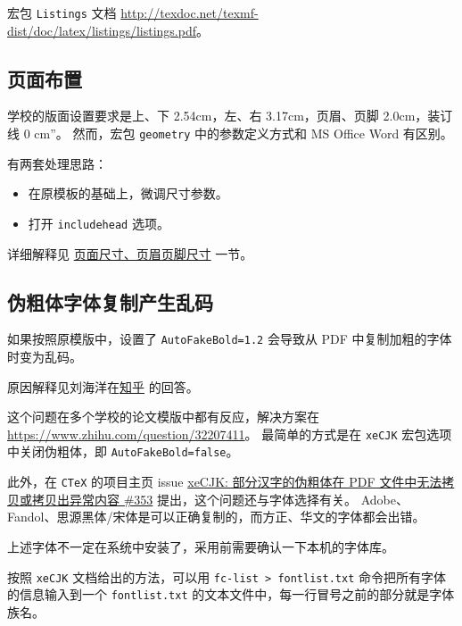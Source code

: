 \documentclass[../Main/thesis.tex]{subfiles}
\begin{document}
宏包 \texttt{Listings} 文档
\url{http://texdoc.net/texmf-dist/doc/latex/listings/listings.pdf}。

\subsection{页面布置}

学校的版面设置要求是上、下 2.54cm，左、右 3.17cm，页眉、页脚
2.0cm，装订线 0 cm''。 然而，宏包 \texttt{geometry}
中的参数定义方式和 MS Office Word 有区别。

有两套处理思路：

\begin{itemize}
\item
  在原模板的基础上，微调尺寸参数。

\item
  打开 \texttt{includehead} 选项。

\end{itemize}

详细解释见
\protect\hyperlink{geometry-ux5cux25e9ux5cux25a1ux5cux25b5ux5cux25e9ux5cux259dux5cux25a2ux5cux25e5ux5cux25b0ux5cux25baux5cux25e5ux5cux25afux5cux25b8ux5cux25e9ux5cux25a1ux5cux25b5ux5cux25e7ux5cux259cux5cux2589ux5cux25e9ux5cux25a1ux5cux25b5ux5cux25e8ux5cux2584ux5cux259aux5cux25e5ux5cux25b0ux5cux25baux5cux25e5ux5cux25afux5cux25b8}{页面尺寸、页眉页脚尺寸}
一节。

\subsection{伪粗体字体复制产生乱码}

如果按照原模版中，设置了 \texttt{AutoFakeBold=1.2} 会导致从 PDF
中复制加粗的字体时变为乱码。

原因解释见刘海洋在\href{https://www.zhihu.com/question/59597144}{知乎}
的回答。

这个问题在多个学校的论文模版中都有反应，解决方案在
\url{https://www.zhihu.com/question/32207411}。 最简单的方式是在
\texttt{xeCJK} 宏包选项中关闭伪粗体，即 \texttt{AutoFakeBold=false}。

此外，在 \texttt{CTeX} 的项目主页 issue
\href{https://github.com/CTeX-org/ctex-kit/issues/353}{xeCJK:
部分汉字的伪粗体在 PDF 文件中无法拷贝或拷贝出异常内容 \#353}
提出，这个问题还与字体选择有关。
Adobe、Fandol、思源黑体/宋体是可以正确复制的，而方正、华文的字体都会出错。

上述字体不一定在系统中安装了，采用前需要确认一下本机的字体库。

按照 \texttt{xeCJK} 文档给出的方法，可以用
\texttt{fc-list\ \textgreater{}\ fontlist.txt}
命令把所有字体的信息输入到一个 \texttt{fontlist.txt}
的文本文件中，每一行冒号之前的部分就是字体族名。
\end{document}
